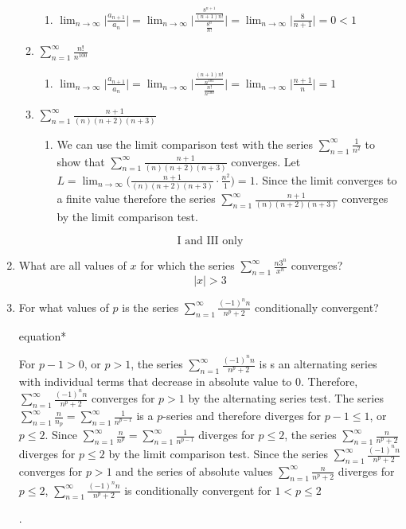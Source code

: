 \documentclass[12pt]{article}
\begin{document}
\begin{enumerate}
\begin{enumerate}[label=\Roman*.]
\begin{enumerate}
			\item 
			$\lim_{n\to\infty} \bigg|\frac{a_{n+1}}{a_n}\bigg| = \lim_{n\to\infty} \Biggr|\frac{\frac{8^{n+1}}{(n+1)n!}}{\frac{8^n}{n!}}\Biggr| =\lim_{n\to\infty} \bigg|\frac{8}{n+1} \bigg|   = 0 < 1$
		\end{enumerate}
        \item $\sum_{n=1}^{\infty} \frac{n!}{n^{100}}$
        \begin{enumerate}
		\item 
		$\lim_{n\to\infty} \bigg|\frac{a_{n+1}}{a_n}\bigg| = \lim_{n\to\infty} \Biggr|\frac{\frac{(n+1)n!}{n^{101}}}{\frac{n!}{n^{100}}}\Biggr| =\lim_{n\to\infty} \bigg|\frac{n+1}{n} \bigg|  = 1 $
	\end{enumerate}
    	\item $\sum_{n=1}^{\infty} \frac{n+1}{(n)(n+2)(n+3)}$
		\begin{enumerate}
			\item 
			We can use the limit comparison test with the series $\sum_{n=1}^{\infty} \frac{1}{n^2}$ to show that $\sum_{n=1}^{\infty} \frac{n+1}{(n)(n+2)(n+3)}$ converges. Let $L = \lim_{n\to\infty} \Big(\frac{n+1}{(n)(n+2)(n+3)} \cdot \frac{n^2}{1}\Big) = 1$. Since the limit converges to a finite value therefore the series $\sum_{n=1}^{\infty} \frac{n+1}{(n)(n+2)(n+3)}$ converges by the limit comparison test. 
		\end{enumerate}
    \end{enumerate}
		$$\boxed{\text{I and III only}}$$
    \item What are all values of $x$ for which the series $\sum_{n=1}^{\infty} \frac{n3^n}{x^n}$ converges?
	$$\boxed{|x| > 3}$$
	\item For what values of $p$ is the series $\sum_{n=1}^{\infty} \frac{(-1)^n n}{n^p + 2}$ conditionally convergent?
	\begin{empheq}[box=\tcbhighmath]{equation*}
		\parbox{6in}{For $p-1 > 0$, or $p > 1$, the series $\sum_{n=1}^{\infty} \frac{(-1)^n n}{n^p + 2}$ is s an alternating series with individual terms that decrease in absolute value to $0$. Therefore, $\sum_{n=1}^{\infty} \frac{(-1)^n n}{n^p + 2}$ converges for $p>1$ by the alternating series test. The series $\sum_{n=1}^{\infty} \frac{n}{n_p} = \sum_{n=1}^{\infty} \frac{1}{n^{p-1}}$ is a $p$-series and therefore diverges for $p-1 \leq 1$, or $p\leq2$. Since $\sum_{n=1}^{\infty} \frac{n}{n^p} = \sum_{n=1}^{\infty} \frac{1}{n^{p-1}}$ diverges for $p\leq 2$, the series $\sum_{n=1}^{\infty} \frac{n}{n^p +2}$ diverges for $p\leq 2$ by the limit comparison test. Since the series $\sum_{n=1}^{\infty} \frac{(-1)^n n}{n^p + 2}$ converges for $p>1$ and the series of absolute values $\sum_{n=1}^{\infty} \frac{n}{n^p +2}$ diverges for $p\leq2$, $\sum_{n=1}^{\infty} \frac{(-1)^n n}{n^p + 2}$ is conditionally convergent for $1<p \leq 2$}.

\end{empheq}
\end{enumerate}
\end{document}
